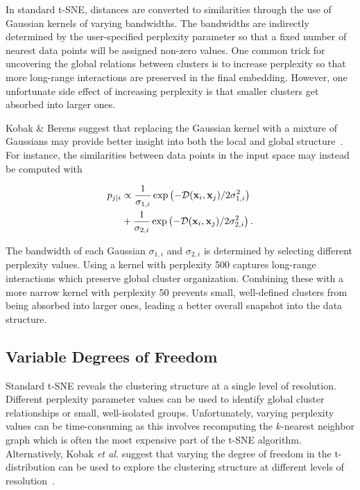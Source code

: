 \documentclass[twocolumn]{article}
\begin{document}
In standard t-SNE, distances are converted to similarities through the use of
Gaussian kernels of varying bandwidths. The bandwidths are indirectly determined
by the user-specified perplexity parameter so that a fixed number of nearest
data points will be assigned non-zero values. One common trick for uncovering
the global relations between clusters is to increase perplexity so that more
long-range interactions are preserved in the final embedding.  However, one
unfortunate side effect of increasing perplexity is that smaller clusters get
absorbed into larger ones.

Kobak \& Berens suggest that replacing the Gaussian kernel with a mixture of
Gaussians may provide better insight into both the local and global
structure~\cite{kobak2019art}. For instance, the similarities between data
points in the input space may instead be computed with

\begin{align}
  p_{j\mid i} &\propto \frac{1}{\sigma_{1,i}} \exp \left ( -\mathcal{D}(\mathbf{x}_i, \mathbf{x}_j ) / 2\sigma_{1,i}^2 \right ) \notag \\
  &+ \frac{1}{\sigma_{2,i}} \exp \left ( -\mathcal{D}(\mathbf{x}_i, \mathbf{x}_j ) / 2\sigma_{2,i}^2 \right ).
\end{align}

The bandwidth of each Gaussian $\sigma_{1,i}$ and $\sigma_{2,i}$ is determined
by selecting different perplexity values. Using a kernel with perplexity 500
captures long-range interactions which preserve global cluster organization.
Combining these with a more narrow kernel with perplexity 50 prevents small,
well-defined clusters from being absorbed into larger ones, leading a better
overall snapshot into the data structure.

\subsection*{Variable Degrees of Freedom}

Standard t-SNE reveals the clustering structure at a single level of resolution.
Different perplexity parameter values can be used to identify global cluster
relationships or small, well-isolated groups. Unfortunately, varying perplexity
values can be time-consuming as this involves recomputing the $k$-nearest
neighbor graph which is often the most expensive part of the t-SNE algorithm.
Alternatively, Kobak \textit{et al.} suggest that varying the degree of freedom
in the t-distribution can be used to explore the clustering structure at
different levels of resolution~\cite{kobak2019heavy}. 
\end{document}
